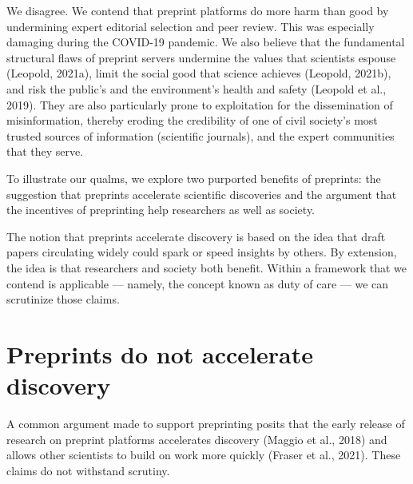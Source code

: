 \documentclass[authordate, perspective]{jote-new-article}
\begin{document}
	We disagree. We contend that preprint platforms do more harm than good by undermining expert editorial selection and peer review. This was especially damaging during the COVID-19 pandemic. We also believe that the fundamental structural flaws of preprint servers undermine the values that scientists espouse (Leopold, 2021a), limit the social good that science achieves (Leopold, 2021b), and risk the public's and the environment's health and safety (Leopold et al., 2019). They are also particularly prone to exploitation for the dissemination of misinformation, thereby eroding the credibility of one of civil society's most trusted sources of information (scientific journals), and the expert communities that they serve.







	To illustrate our qualms, we explore two purported benefits of preprints: the suggestion that preprints accelerate scientific discoveries and the argument that the incentives of preprinting help researchers as well as society.







	The notion that preprints accelerate discovery is based on the idea that draft papers circulating widely could spark or speed insights by others. By extension, the idea is that researchers and society both benefit. Within a framework that we contend is applicable — namely, the concept known as duty of care — we can scrutinize those claims.







	\section{Preprints do not accelerate discovery}







	A common argument made to support preprinting posits that the early release of research on preprint platforms accelerates discovery (Maggio et al., 2018) and allows other scientists to build on work more quickly (Fraser et al., 2021). These claims do not withstand scrutiny.
\end{document}
